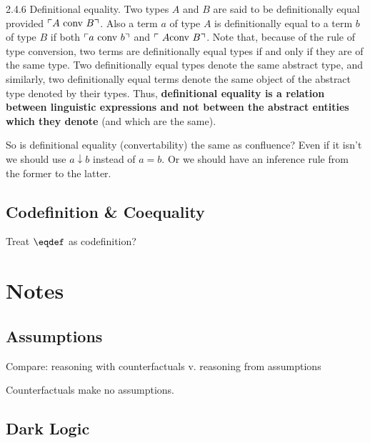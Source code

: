 \documentclass{article}
\begin{document}
\vspace{2ex}

\begin{displayquote} 2.4.6 Definitional equality. Two types \(A\) and \(B\) are
  said to be {\upshape definitionally equal} provided \(\ulcorner
  A\ \text{\upshape conv}\ B\urcorner\). Also a term \(a\) of type
  \(A\) is definitionally equal to a term \(b\) of type \(B\) if both
  \(\ulcorner a\ \text{\upshape conv}\ b\urcorner\) and \(\ulcorner\ A
  \text{\upshape conv}\ B\urcorner\). Note that, because of the rule of type
  conversion, two terms are definitionally equal types if and only if
  they are of the same type. Two definitionally equal types denote the
  same abstract type, and similarly, two definitionally equal terms
  denote the same object of the abstract type denoted by their types.
  Thus, \textbf{definitional equality is a relation between linguistic
    expressions and not between the abstract entities which they
    denote} (and which are the same).
\end{displayquote}

So is definitional equality (convertability) the same as confluence?
Even if it isn't we should use \(a\downarrow b\) instead of \(a = b\).
Or we should have an inference rule from the former to the latter.

\subsection{Codefinition \& Coequality}

Treat \(\defeq\) as codefinition?

\section{Notes}

\subsection{Assumptions}

Compare: reasoning with counterfactuals v. reasoning from assumptions

Counterfactuals make no assumptions.

\subsection{Dark Logic}
\end{document}
